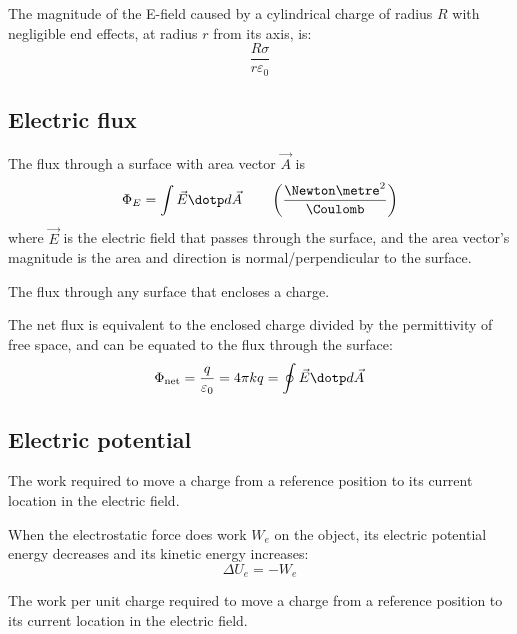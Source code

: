 \begin{example}
  The magnitude of the E-field caused by a cylindrical charge of radius $R$ with negligible end effects, at radius $r$ from its axis, is:
  \[
    \frac{R\sigma}{r\varepsilon_0}
  \]
\end{example}

\subsection{Electric flux}

\begin{definition}
  The flux through a surface with area vector $\vec{A}$ is
  \[
    \Phi_E = \int \vec{E} \dotp d\vec{A} \qquad \left(\frac{\Newton \metre^2}{\Coulomb}\right)
  \]
  where $\vec{E}$ is the electric field that passes through the surface, and the area vector's magnitude is the area and direction is normal/perpendicular to the surface.
\end{definition}

\begin{definition}
  The flux through any surface that encloses a charge.
\end{definition}

\begin{namedtheorem}
  The net flux is equivalent to the enclosed charge divided by the permittivity of free space, and can be equated to the flux through the surface:
  \[
    \Phi_{\text{net}} = \frac{q}{\varepsilon_0} = 4\pi k q = \oint \vec{E} \dotp d\vec{A}
  \]
\end{namedtheorem}

\subsection{Electric potential}

\begin{definition}
  The work required to move a charge from a reference position to its current location in the electric field.

  When the electrostatic force does work $W_e$ on the object, its electric potential energy decreases and its kinetic energy increases:
  \[
    \Delta U_e = -W_e
  \]
\end{definition}

\begin{definition}
  The work per unit charge required to move a charge from a reference position to its current location in the electric field.
\end{definition}

